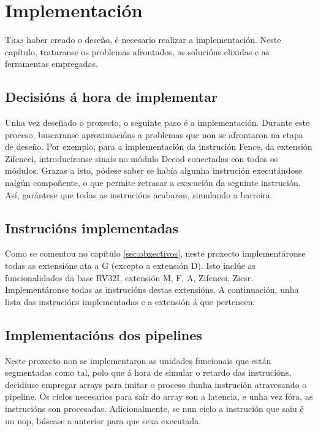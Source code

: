 \chapter{Implementación}
\label{chap:implementacion}

\lettrine{T}{ras} haber creado o deseño, é necesario realizar a implementación. Neste capítulo, trataranse os problemas afrontados, as solucións elixidas e as ferramentas empregadas.

\section{Decisións á hora de implementar}\label{sec:decisions}
Unha vez deseñado o proxecto, o seguinte paso é a implementación. Durante este proceso, buscaranse aproximacións a problemas que non se afrontaron na etapa de deseño. Por exemplo, para a implementación da instrución Fence, da extensión Zifencei, introducíronse sinais no módulo Decod conectadas con todos os módulos. Grazas a isto, pódese saber se había algunha instrución executándose nalgún compoñente, o que permite retrasar a execución da seguinte instrución. Así, garántese que todas as instrucións acabaron, simulando a barreira.


\section{Instrucións implementadas}\label{sec:intrucions_implt}
Como se comentou no capítulo \ref{sec:obxectivos}, neste proxecto implementáronse todas as extensións ata a G (excepto a extensión D). Isto inclúe as funcionalidades da base RV32I, extensión M, F, A, Zifencei, Zicsr. Implementáronse todas as instrucións destas extensións. A continuación, unha lista das instrucións implementadas e a extensión á que pertencen:



\section{Implementacións dos pipelines}\label{sec:implt_pipelines}
Neste proxecto non se implementaron as unidades funcionais que están segmentadas como tal, polo que á hora de simular o retardo das instrucións, decidiuse empregar arrays para imitar o proceso dunha instrución atravesando o pipeline. Os ciclos necesarios para saír do array son a latencia, e unha vez fóra, as instrucións son procesadas. Adicionalmente, se nun ciclo a instrución que saiu é un \acrfull{nop}, búscase a anterior para que sexa executada. 

